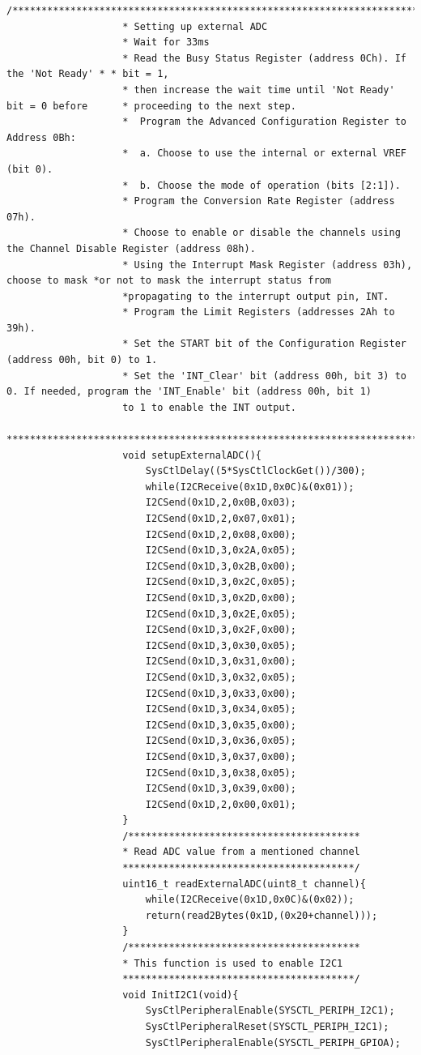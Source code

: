 \documentclass[a4paper,10pt,oneside]{article}
\begin{document}
\begin{lstlisting}[style=CStyle]
					/*********************************************************************************************
					* Setting up external ADC
					* Wait for 33ms
					* Read the Busy Status Register (address 0Ch). If the 'Not Ready' * * bit = 1,
					* then increase the wait time until 'Not Ready' bit = 0 before   	* proceeding to the next step.
					*  Program the Advanced Configuration Register to Address 0Bh:
					*  a. Choose to use the internal or external VREF (bit 0).
					*  b. Choose the mode of operation (bits [2:1]).
					* Program the Conversion Rate Register (address 07h).
					* Choose to enable or disable the channels using the Channel Disable Register (address 08h).
					* Using the Interrupt Mask Register (address 03h), choose to mask *or not to mask the interrupt status from
					*propagating to the interrupt output pin, INT.
					* Program the Limit Registers (addresses 2Ah to 39h).
					* Set the START bit of the Configuration Register (address 00h, bit 0) to 1.
					* Set the 'INT_Clear' bit (address 00h, bit 3) to 0. If needed, program the 'INT_Enable' bit (address 00h, bit 1)
					to 1 to enable the INT output.
					*********************************************************************************************/
					void setupExternalADC(){
						SysCtlDelay((5*SysCtlClockGet())/300);
						while(I2CReceive(0x1D,0x0C)&(0x01));
						I2CSend(0x1D,2,0x0B,0x03);
						I2CSend(0x1D,2,0x07,0x01);
						I2CSend(0x1D,2,0x08,0x00);
						I2CSend(0x1D,3,0x2A,0x05);
						I2CSend(0x1D,3,0x2B,0x00);
						I2CSend(0x1D,3,0x2C,0x05);
						I2CSend(0x1D,3,0x2D,0x00);
						I2CSend(0x1D,3,0x2E,0x05);
						I2CSend(0x1D,3,0x2F,0x00);
						I2CSend(0x1D,3,0x30,0x05);
						I2CSend(0x1D,3,0x31,0x00);
						I2CSend(0x1D,3,0x32,0x05);
						I2CSend(0x1D,3,0x33,0x00);
						I2CSend(0x1D,3,0x34,0x05);
						I2CSend(0x1D,3,0x35,0x00);
						I2CSend(0x1D,3,0x36,0x05);
						I2CSend(0x1D,3,0x37,0x00);
						I2CSend(0x1D,3,0x38,0x05);
						I2CSend(0x1D,3,0x39,0x00);
						I2CSend(0x1D,2,0x00,0x01);
					}
					/****************************************
					* Read ADC value from a mentioned channel
					****************************************/
					uint16_t readExternalADC(uint8_t channel){
						while(I2CReceive(0x1D,0x0C)&(0x02));
						return(read2Bytes(0x1D,(0x20+channel)));
					}
					/****************************************
					* This function is used to enable I2C1
					****************************************/
					void InitI2C1(void){
						SysCtlPeripheralEnable(SYSCTL_PERIPH_I2C1);
						SysCtlPeripheralReset(SYSCTL_PERIPH_I2C1);
						SysCtlPeripheralEnable(SYSCTL_PERIPH_GPIOA);

\end{lstlisting}
\end{document}
